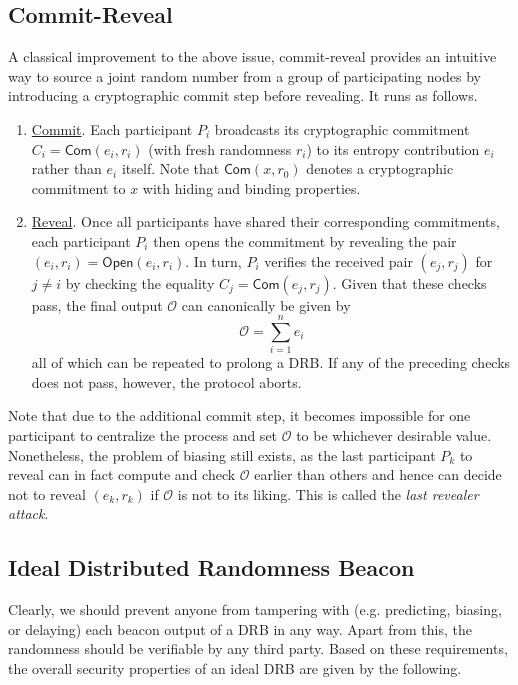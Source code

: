 \documentclass[letterpaper,twocolumn,10pt]{article}
\theoremstyle{definition}
\theoremstyle{remark}
\begin{document}
\subsection{Commit-Reveal}
\label{subsection:commit-reveal}
A classical improvement to the above issue, commit-reveal provides an intuitive way to source a joint random number from a group of participating nodes by introducing a cryptographic commit step before revealing. It runs as follows.
\begin{enumerate}
\item \underline{Commit}. Each participant $P_i$ broadcasts its cryptographic commitment $C_i = \mathsf{Com}(e_i, r_i)$ (with fresh randomness $r_i$) to its entropy contribution $e_i$ rather than $e_i$ itself. Note that $\mathsf{Com}(x, r_0)$ denotes a cryptographic commitment to $x$ with hiding and binding properties.
\item \underline{Reveal}. Once all participants have shared their corresponding commitments, each participant $P_i$ then opens the commitment by revealing the pair $(e_i, r_i) = \mathsf{Open}(e_i, r_i)$. In turn, $P_i$ verifies the received pair $(e_j, r_j)$ for $j \neq i$ by checking the equality $C_j = \mathsf{Com}(e_j, r_j)$. Given that these checks pass, the final output $\mathcal{O}$ can canonically be given by
\[
\mathcal{O} = \sum_{i = 1}^n e_i
\]
all of which can be repeated to prolong a DRB. If any of the preceding checks does not pass, however, the protocol aborts.
\end{enumerate}

Note that due to the additional commit step, it becomes impossible for one participant to centralize the process and set $\mathcal{O}$ to be whichever desirable value. Nonetheless, the problem of biasing still exists, as the last participant $P_k$ to reveal can in fact compute and check $\mathcal{O}$ earlier than others and hence can decide not to reveal $(e_k, r_k)$ if $\mathcal{O}$ is not to its liking. This is called the \textit{last revealer attack}.

\subsection{Ideal Distributed Randomness Beacon}
Clearly, we should prevent anyone from tampering with (e.g. predicting, biasing, or delaying) each beacon output of a DRB in any way. Apart from this, the randomness should be verifiable by any third party. Based on these requirements, the overall security properties of an ideal DRB are given by the following.
\end{document}
